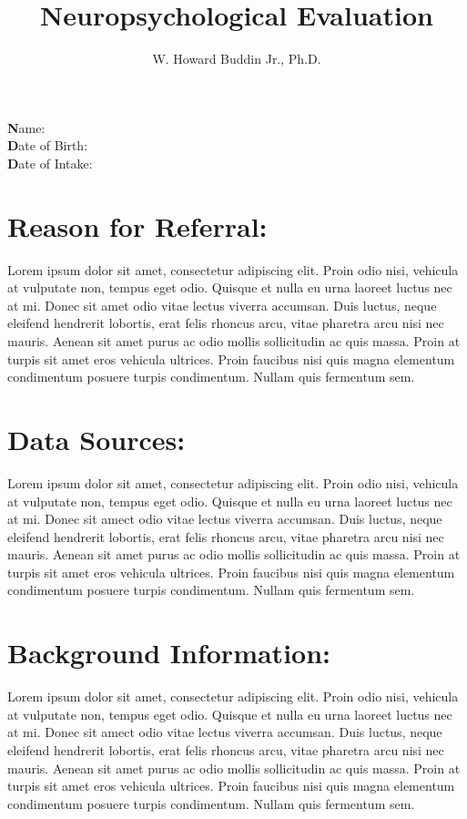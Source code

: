 \documentclass[12pt]{article}
\title{Neuropsychological Evaluation}
\author{W. Howard Buddin Jr., Ph.D.}
\date{}
\begin{document}
\maketitle

\section*{}
{\textbf Name:} \\
{\textbf Date of Birth:} \\
{\textbf Date of Intake:} \\

\section*{\textbf Reason for Referral:}
Lorem ipsum dolor sit amet, consectetur adipiscing elit. Proin odio nisi, vehicula at vulputate non, tempus eget odio. Quisque et nulla eu urna laoreet luctus nec at mi. Donec sit amet odio vitae lectus viverra accumsan. Duis luctus, neque eleifend hendrerit lobortis, erat felis rhoncus arcu, vitae pharetra arcu nisi nec mauris. Aenean sit amet purus ac odio mollis sollicitudin ac quis massa. Proin at turpis sit amet eros vehicula ultrices. Proin faucibus nisi quis magna elementum condimentum posuere turpis condimentum. Nullam quis fermentum sem.

\section*{\textbf Data Sources:}
Lorem ipsum dolor sit amet, consectetur adipiscing elit. Proin odio nisi, vehicula at vulputate non, tempus eget odio. Quisque et nulla eu urna laoreet luctus nec at mi. Donec sit amect odio vitae lectus viverra accumsan. Duis luctus, neque eleifend hendrerit lobortis, erat felis rhoncus arcu, vitae pharetra arcu nisi nec mauris. Aenean sit amet purus ac odio mollis sollicitudin ac quis massa. Proin at turpis sit amet eros vehicula ultrices. Proin faucibus nisi quis magna elementum condimentum posuere turpis condimentum. Nullam quis fermentum sem.

\section*{\textbf Background Information:}
Lorem ipsum dolor sit amet, consectetur adipiscing elit. Proin odio nisi, vehicula at vulputate non, tempus eget odio. Quisque et nulla eu urna laoreet luctus nec at mi. Donec sit amect odio vitae lectus viverra accumsan. Duis luctus, neque eleifend hendrerit lobortis, erat felis rhoncus arcu, vitae pharetra arcu nisi nec mauris. Aenean sit amet purus ac odio mollis sollicitudin ac quis massa. Proin at turpis sit amet eros vehicula ultrices. Proin faucibus nisi quis magna elementum condimentum posuere turpis condimentum. Nullam quis fermentum sem.
\end{document}
